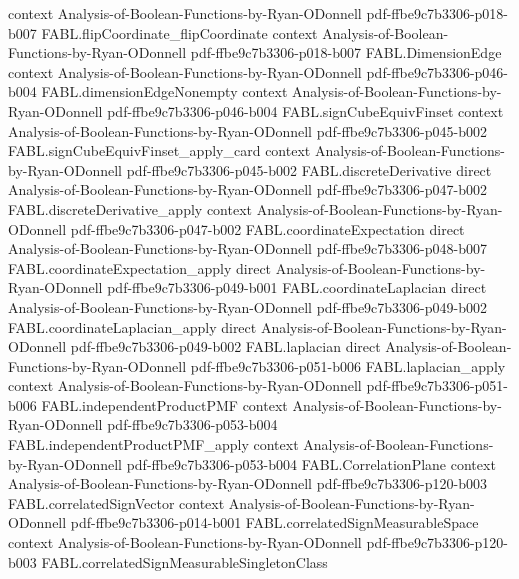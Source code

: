 \begin{theorem}
  {context}
  {Analysis-of-Boolean-Functions-by-Ryan-ODonnell}
  {pdf-ffbe9c7b3306-p018-b007}
\proofstep
  {FABL.flipCoordinate_flipCoordinate}
  {context}
  {Analysis-of-Boolean-Functions-by-Ryan-ODonnell}
  {pdf-ffbe9c7b3306-p018-b007}
\proofstep
  {FABL.DimensionEdge}
  {context}
  {Analysis-of-Boolean-Functions-by-Ryan-ODonnell}
  {pdf-ffbe9c7b3306-p046-b004}
\proofstep
  {FABL.dimensionEdgeNonempty}
  {context}
  {Analysis-of-Boolean-Functions-by-Ryan-ODonnell}
  {pdf-ffbe9c7b3306-p046-b004}
\proofstep
  {FABL.signCubeEquivFinset}
  {context}
  {Analysis-of-Boolean-Functions-by-Ryan-ODonnell}
  {pdf-ffbe9c7b3306-p045-b002}
\proofstep
  {FABL.signCubeEquivFinset_apply_card}
  {context}
  {Analysis-of-Boolean-Functions-by-Ryan-ODonnell}
  {pdf-ffbe9c7b3306-p045-b002}
\proofstep
  {FABL.discreteDerivative}
  {direct}
  {Analysis-of-Boolean-Functions-by-Ryan-ODonnell}
  {pdf-ffbe9c7b3306-p047-b002}
\proofstep
  {FABL.discreteDerivative_apply}
  {context}
  {Analysis-of-Boolean-Functions-by-Ryan-ODonnell}
  {pdf-ffbe9c7b3306-p047-b002}
\proofstep
  {FABL.coordinateExpectation}
  {direct}
  {Analysis-of-Boolean-Functions-by-Ryan-ODonnell}
  {pdf-ffbe9c7b3306-p048-b007}
\proofstep
  {FABL.coordinateExpectation_apply}
  {direct}
  {Analysis-of-Boolean-Functions-by-Ryan-ODonnell}
  {pdf-ffbe9c7b3306-p049-b001}
\proofstep
  {FABL.coordinateLaplacian}
  {direct}
  {Analysis-of-Boolean-Functions-by-Ryan-ODonnell}
  {pdf-ffbe9c7b3306-p049-b002}
\proofstep
  {FABL.coordinateLaplacian_apply}
  {direct}
  {Analysis-of-Boolean-Functions-by-Ryan-ODonnell}
  {pdf-ffbe9c7b3306-p049-b002}
\proofstep
  {FABL.laplacian}
  {direct}
  {Analysis-of-Boolean-Functions-by-Ryan-ODonnell}
  {pdf-ffbe9c7b3306-p051-b006}
\proofstep
  {FABL.laplacian_apply}
  {context}
  {Analysis-of-Boolean-Functions-by-Ryan-ODonnell}
  {pdf-ffbe9c7b3306-p051-b006}
\proofstep
  {FABL.independentProductPMF}
  {context}
  {Analysis-of-Boolean-Functions-by-Ryan-ODonnell}
  {pdf-ffbe9c7b3306-p053-b004}
\proofstep
  {FABL.independentProductPMF_apply}
  {context}
  {Analysis-of-Boolean-Functions-by-Ryan-ODonnell}
  {pdf-ffbe9c7b3306-p053-b004}
\proofstep
  {FABL.CorrelationPlane}
  {context}
  {Analysis-of-Boolean-Functions-by-Ryan-ODonnell}
  {pdf-ffbe9c7b3306-p120-b003}
\proofstep
  {FABL.correlatedSignVector}
  {context}
  {Analysis-of-Boolean-Functions-by-Ryan-ODonnell}
  {pdf-ffbe9c7b3306-p014-b001}
\proofstep
  {FABL.correlatedSignMeasurableSpace}
  {context}
  {Analysis-of-Boolean-Functions-by-Ryan-ODonnell}
  {pdf-ffbe9c7b3306-p120-b003}
\proofstep
  {FABL.correlatedSignMeasurableSingletonClass}

\end{theorem}
